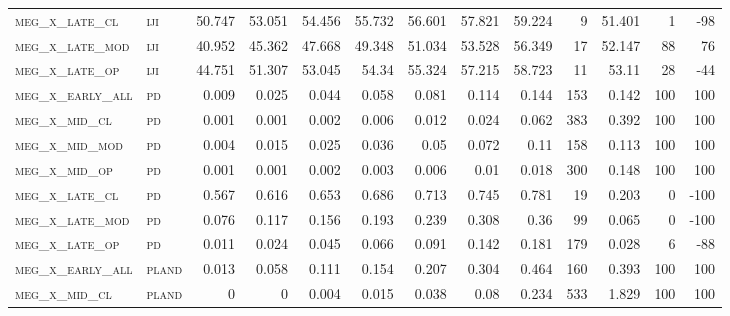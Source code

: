 \begin{landscape}
\begin{center}
\begin{footnotesize}
\begin{longtable}{llrrrrrrrr|rrr}
\textsc{meg\_x\_late\_cl  } & \textsc{iji       }   & 50.747   & 53.051   & 54.456   & 55.732   & 56.601   & 57.821   & 59.224    & 9      & 51.401        & 1             & -98             \\
\textsc{meg\_x\_late\_mod } & \textsc{iji       }   & 40.952   & 45.362   & 47.668   & 49.348   & 51.034   & 53.528   & 56.349    & 17     & 52.147        & 88            & 76              \\
\textsc{meg\_x\_late\_op  } & \textsc{iji       }   & 44.751   & 51.307   & 53.045   & 54.34    & 55.324   & 57.215   & 58.723    & 11     & 53.11         & 28            & -44             \\
\textsc{meg\_x\_early\_all} & \textsc{pd        }   & 0.009    & 0.025    & 0.044    & 0.058    & 0.081    & 0.114    & 0.144     & 153    & 0.142         & 100           & 100             \\
\textsc{meg\_x\_mid\_cl   } & \textsc{pd        }   & 0.001    & 0.001    & 0.002    & 0.006    & 0.012    & 0.024    & 0.062     & 383    & 0.392         & 100           & 100             \\
\textsc{meg\_x\_mid\_mod  } & \textsc{pd        }   & 0.004    & 0.015    & 0.025    & 0.036    & 0.05     & 0.072    & 0.11      & 158    & 0.113         & 100           & 100             \\
\textsc{meg\_x\_mid\_op   } & \textsc{pd        }   & 0.001    & 0.001    & 0.002    & 0.003    & 0.006    & 0.01     & 0.018     & 300    & 0.148         & 100           & 100             \\
\textsc{meg\_x\_late\_cl  } & \textsc{pd        }   & 0.567    & 0.616    & 0.653    & 0.686    & 0.713    & 0.745    & 0.781     & 19     & 0.203         & 0             & -100            \\
\textsc{meg\_x\_late\_mod } & \textsc{pd        }   & 0.076    & 0.117    & 0.156    & 0.193    & 0.239    & 0.308    & 0.36      & 99     & 0.065         & 0             & -100            \\
\textsc{meg\_x\_late\_op  } & \textsc{pd        }   & 0.011    & 0.024    & 0.045    & 0.066    & 0.091    & 0.142    & 0.181     & 179    & 0.028         & 6             & -88             \\
\textsc{meg\_x\_early\_all} & \textsc{pland     }   & 0.013    & 0.058    & 0.111    & 0.154    & 0.207    & 0.304    & 0.464     & 160    & 0.393         & 100           & 100             \\
\textsc{meg\_x\_mid\_cl   } & \textsc{pland     }   & 0        & 0        & 0.004    & 0.015    & 0.038    & 0.08     & 0.234     & 533    & 1.829         & 100           & 100             \\

\end{longtable}
\end{footnotesize}
\end{center}
\end{landscape}
